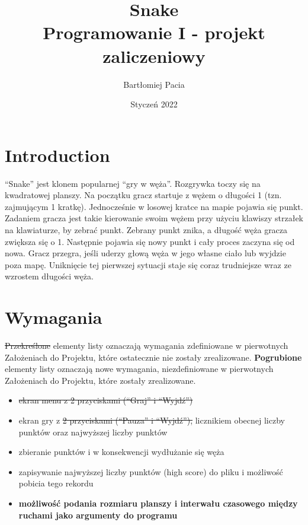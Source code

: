 \documentclass[12pt]{article}
\title{%
    Snake \\
    \large Programowanie I - projekt zaliczeniowy}
\author{Bartłomiej Pacia}
\date{Styczeń 2022}
\begin{document}
\maketitle

\section{Introduction}

“Snake” jest klonem popularnej “gry w węża”. Rozgrywka toczy się na kwadratowej
planszy. Na początku gracz startuje z wężem o długości 1 (tzn. zajmującym 1
kratkę). Jednocześnie w losowej kratce na mapie pojawia się punkt. Zadaniem
gracza jest takie kierowanie swoim wężem przy użyciu klawiszy strzałek na
klawiaturze, by zebrać punkt. Zebrany punkt znika, a długość węża gracza
zwiększa się o 1. Następnie pojawia się nowy punkt i cały proces zaczyna się od
nowa. Gracz przegra, jeśli uderzy głową węża w jego własne ciało lub wyjdzie
poza mapę. Uniknięcie tej pierwszej sytuacji staje się coraz trudniejsze wraz ze
wzrostem długości węża.

\section{Wymagania}

\sout{Przekreślone} elementy listy oznaczają wymagania zdefiniowane w
pierwotnych Założeniach do Projektu, które ostatecznie nie zostały zrealizowane.
\textbf{Pogrubione} elementy listy oznaczają nowe wymagania, niezdefiniowane w
pierwotnych Założeniach do Projektu, które zostały zrealizowane.
\begin{itemize}
    \item \sout{ekran menu z 2 przyciskami (“Graj” i “Wyjdź”)}

    \item ekran gry z \sout{2 przyciskami (“Pauza” i “Wyjdź”),} licznikiem
          obecnej liczby punktów oraz najwyższej liczby punktów

    \item zbieranie punktów i w konsekwencji wydłużanie się węża

    \item zapisywanie najwyższej liczby punktów (high score) do pliku i
          możliwość pobicia tego rekordu

    \item \textbf{możliwość podania rozmiaru planszy i interwału czasowego
              między ruchami jako argumenty do programu}

\end{itemize}
\end{document}
